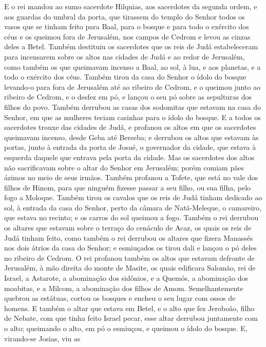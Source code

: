 E o rei mandou ao sumo sacerdote Hilquias, aos sacerdotes da
segunda ordem, e aos guardas do umbral da porta, que tirassem do
templo do Senhor todos os vasos que se tinham feito para Baal, para
o bosque e para todo o exército dos céus e os queimou fora de
Jerusalém, nos campos de Cedrom e levou as cinzas deles a Betel.
Também destituiu os sacerdotes que os reis de Judá estabeleceram
para incensarem sobre os altos nas cidades de Judá e ao redor de
Jerusalém, como também os que queimavam incenso a Baal, ao sol, à
lua, e aos planetas, e a todo o exército dos céus. Também tirou
da casa do Senhor o ídolo do bosque levando-o para fora de Jerusalém
até ao ribeiro de Cedrom, e o queimou junto ao ribeiro de Cedrom, e
o desfez em pó, e lançou o seu pó sobre as sepulturas dos filhos do
povo. Também derrubou as casas dos sodomitas que estavam na casa
do Senhor, em que as mulheres teciam casinhas para o ídolo do
bosque. E a todos os sacerdotes trouxe das cidades de Judá, e
profanou os altos em que os sacerdotes queimavam incenso, desde Geba
até Berseba; e derrubou os altos que estavam às portas, junto à
entrada da porta de Josué, o governador da cidade, que estava à
esquerda daquele que entrava pela porta da cidade. Mas os
sacerdotes dos altos não sacrificavam sobre o altar do Senhor em
Jerusalém; porém comiam pães ázimos no meio de seus irmãos.
Também profanou a Tofete, que está no vale dos filhos de
Hinom, para que ninguém fizesse passar a seu filho, ou sua filha,
pelo fogo a Moloque. Também tirou os cavalos que os reis de
Judá tinham dedicado ao sol, à entrada da casa do Senhor, perto da
câmara de Natã-Meleque, o camareiro, que estava no recinto; e os
carros do sol queimou a fogo. Também o rei derrubou os
altares que estavam sobre o terraço do cenáculo de Acaz, os quais os
reis de Judá tinham feito, como também o rei derrubou os altares que
fizera Manassés nos dois átrios da casa do Senhor; e esmiuçados os
tirou dali e lançou o pó deles no ribeiro de Cedrom. O rei
profanou também os altos que estavam defronte de Jerusalém, à mão
direita do monte de Masite, os quais edificara Salomão, rei de
Israel, a Astarote, a abominação dos sidônios, e a Quemós, a
abominação dos moabitas, e a Milcom, a abominação dos filhos de
Amom. Semelhantemente quebrou as estátuas, cortou os bosques
e encheu o seu lugar com ossos de homens.
 E também o altar que estava em Betel, e o alto que fez Jeroboão,
filho de Nebate, com que tinha feito Israel pecar, esse altar
derrubou juntamente com o alto; queimando o alto, em pó o esmiuçou,
e queimou o ídolo do bosque. E, virando-se Josias, viu as
